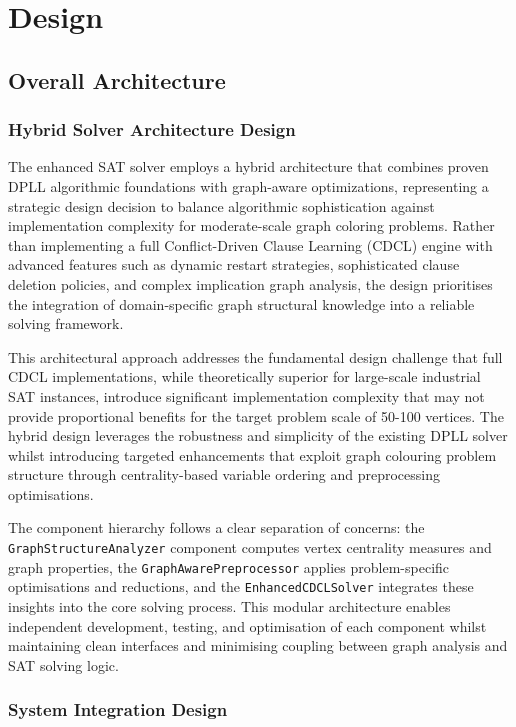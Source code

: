 \section{Design}

\subsection{Overall Architecture}

\subsubsection{Hybrid Solver Architecture Design}

The enhanced SAT solver employs a hybrid architecture that combines proven DPLL algorithmic foundations with graph-aware optimizations, representing a strategic design decision to balance algorithmic sophistication against implementation complexity for moderate-scale graph coloring problems. Rather than implementing a full Conflict-Driven Clause Learning (CDCL) engine with advanced features such as dynamic restart strategies, sophisticated clause deletion policies, and complex implication graph analysis, the design prioritises the integration of domain-specific graph structural knowledge into a reliable solving framework.

This architectural approach addresses the fundamental design challenge that full CDCL implementations, while theoretically superior for large-scale industrial SAT instances, introduce significant implementation complexity that may not provide proportional benefits for the target problem scale of 50-100 vertices. The hybrid design leverages the robustness and simplicity of the existing DPLL solver whilst introducing targeted enhancements that exploit graph colouring problem structure through centrality-based variable ordering and preprocessing optimisations.

The component hierarchy follows a clear separation of concerns: the \texttt{Graph\-Structure\-Analyzer} component computes vertex centrality measures and graph properties, the \texttt{Graph\-Aware\-Preprocessor} applies problem-specific optimisations and reductions, and the \texttt{Enhanced\-CDCL\-Solver} integrates these insights into the core solving process. This modular architecture enables independent development, testing, and optimisation of each component whilst maintaining clean interfaces and minimising coupling between graph analysis and SAT solving logic.

\subsubsection{System Integration Design}

